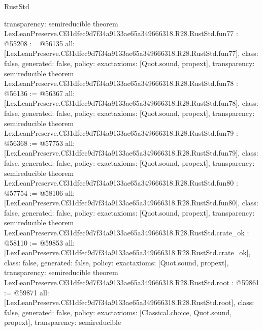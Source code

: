 \begin{lexlean}{RustStd}
\begin{coremodule}
{  transparency: semireducible
}
theorem LexLeanPreserve.Cf31dfec9d7f34a9133ae65a349666318.R28.RustStd.fun77 : @55208 := @56135 {
  all: [LexLeanPreserve.Cf31dfec9d7f34a9133ae65a349666318.R28.RustStd.fun77],
  class: false,
  generated: false,
  policy: exact{axioms: [Quot.sound, propext]},
  transparency: semireducible
}
theorem LexLeanPreserve.Cf31dfec9d7f34a9133ae65a349666318.R28.RustStd.fun78 : @56136 := @56367 {
  all: [LexLeanPreserve.Cf31dfec9d7f34a9133ae65a349666318.R28.RustStd.fun78],
  class: false,
  generated: false,
  policy: exact{axioms: [Quot.sound, propext]},
  transparency: semireducible
}
theorem LexLeanPreserve.Cf31dfec9d7f34a9133ae65a349666318.R28.RustStd.fun79 : @56368 := @57753 {
  all: [LexLeanPreserve.Cf31dfec9d7f34a9133ae65a349666318.R28.RustStd.fun79],
  class: false,
  generated: false,
  policy: exact{axioms: [Quot.sound, propext]},
  transparency: semireducible
}
theorem LexLeanPreserve.Cf31dfec9d7f34a9133ae65a349666318.R28.RustStd.fun80 : @57754 := @58106 {
  all: [LexLeanPreserve.Cf31dfec9d7f34a9133ae65a349666318.R28.RustStd.fun80],
  class: false,
  generated: false,
  policy: exact{axioms: [Quot.sound, propext]},
  transparency: semireducible
}
theorem LexLeanPreserve.Cf31dfec9d7f34a9133ae65a349666318.R28.RustStd.crate_ok : @58110 := @59853 {
  all: [LexLeanPreserve.Cf31dfec9d7f34a9133ae65a349666318.R28.RustStd.crate_ok],
  class: false,
  generated: false,
  policy: exact{axioms: [Quot.sound, propext]},
  transparency: semireducible
}
theorem LexLeanPreserve.Cf31dfec9d7f34a9133ae65a349666318.R28.RustStd.root : @59861 := @59871 {
  all: [LexLeanPreserve.Cf31dfec9d7f34a9133ae65a349666318.R28.RustStd.root],
  class: false,
  generated: false,
  policy: exact{axioms: [Classical.choice, Quot.sound, propext]},
  transparency: semireducible
}


\end{coremodule}
\end{lexlean}
